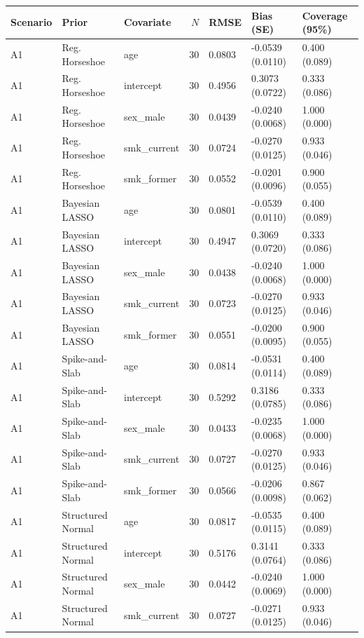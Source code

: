 \begin{tabular}{lllrlll}
  \hline
Scenario & Prior & Covariate & $N$ & RMSE & Bias (SE) & Coverage (95\%) \\ 
  \hline
A1 & Reg. Horseshoe & age &  30 & 0.0803 & -0.0539 (0.0110) & 0.400 (0.089) \\ 
  A1 & Reg. Horseshoe & intercept &  30 & 0.4956 & 0.3073 (0.0722) & 0.333 (0.086) \\ 
  A1 & Reg. Horseshoe & sex\_male &  30 & 0.0439 & -0.0240 (0.0068) & 1.000 (0.000) \\ 
  A1 & Reg. Horseshoe & smk\_current &  30 & 0.0724 & -0.0270 (0.0125) & 0.933 (0.046) \\ 
  A1 & Reg. Horseshoe & smk\_former &  30 & 0.0552 & -0.0201 (0.0096) & 0.900 (0.055) \\ 
  A1 & Bayesian LASSO & age &  30 & 0.0801 & -0.0539 (0.0110) & 0.400 (0.089) \\ 
  A1 & Bayesian LASSO & intercept &  30 & 0.4947 & 0.3069 (0.0720) & 0.333 (0.086) \\ 
  A1 & Bayesian LASSO & sex\_male &  30 & 0.0438 & -0.0240 (0.0068) & 1.000 (0.000) \\ 
  A1 & Bayesian LASSO & smk\_current &  30 & 0.0723 & -0.0270 (0.0125) & 0.933 (0.046) \\ 
  A1 & Bayesian LASSO & smk\_former &  30 & 0.0551 & -0.0200 (0.0095) & 0.900 (0.055) \\ 
  A1 & Spike-and-Slab & age &  30 & 0.0814 & -0.0531 (0.0114) & 0.400 (0.089) \\ 
  A1 & Spike-and-Slab & intercept &  30 & 0.5292 & 0.3186 (0.0785) & 0.333 (0.086) \\ 
  A1 & Spike-and-Slab & sex\_male &  30 & 0.0433 & -0.0235 (0.0068) & 1.000 (0.000) \\ 
  A1 & Spike-and-Slab & smk\_current &  30 & 0.0727 & -0.0270 (0.0125) & 0.933 (0.046) \\ 
  A1 & Spike-and-Slab & smk\_former &  30 & 0.0566 & -0.0206 (0.0098) & 0.867 (0.062) \\ 
  A1 & Structured Normal & age &  30 & 0.0817 & -0.0535 (0.0115) & 0.400 (0.089) \\ 
  A1 & Structured Normal & intercept &  30 & 0.5176 & 0.3141 (0.0764) & 0.333 (0.086) \\ 
  A1 & Structured Normal & sex\_male &  30 & 0.0442 & -0.0240 (0.0069) & 1.000 (0.000) \\ 
  A1 & Structured Normal & smk\_current &  30 & 0.0727 & -0.0271 (0.0125) & 0.933 (0.046) \\ 

\end{tabular}
